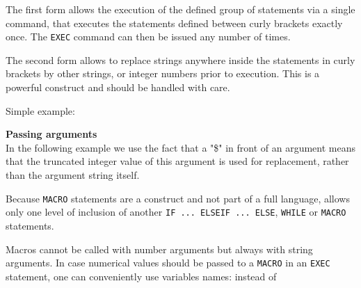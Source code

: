
The first form allows the execution of the defined group of statements via a
single command,  
that executes the statements defined between curly brackets exactly
once. The \texttt{EXEC} command can then be issued any number of times.  

The second form allows to replace strings anywhere inside the statements
in curly brackets by other strings, or integer numbers prior to
execution. This is a powerful construct and should be handled with care.  

Simple example: 


\textbf{Passing arguments}\\
In the following example we use the fact that a "\$" in front of an
argument means that the truncated integer value of this argument is used
for replacement, rather than the argument string itself.  


Because \texttt{MACRO} statements are a \madx construct and not part of
a full language, \madx  allows only one level of inclusion of another
\texttt{IF ... ELSEIF ... ELSE}, \texttt{WHILE} or \texttt{MACRO}
statements.   


Macros cannot be called with number arguments but always with string
arguments. In case numerical values should be passed to a \texttt{MACRO}
in an \texttt{EXEC} statement, one can conveniently use variables names: 
instead of 

